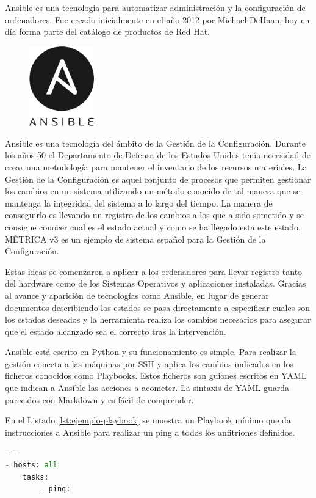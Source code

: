 Ansible es una tecnología para automatizar administración y la configuración de ordenadores. Fue creado inicialmente en el año 2012 por Michael DeHaan, hoy en día forma parte del catálogo de productos de Red Hat.

\begin{figure}
    \centering
    \includegraphics[width=0.25\textwidth]{imaxes/e-fundamentos-tecnologicos/logo-ansible.png}
\end{figure}

Ansible es una tecnología del ámbito de la Gestión de la Configuración. Durante los años 50 el Departamento de Defensa de los Estados Unidos tenía necesidad de crear una metodología para mantener el inventario de los recursos materiales. La Gestión de la Configuración es aquel conjunto de procesos que permiten gestionar los cambios en un sistema utilizando un método conocido de tal manera que se mantenga la integridad del sistema a lo largo del tiempo. La manera de conseguirlo es llevando un registro de los cambios a los que a sido sometido y se consigue conocer cual es el estado actual y como se ha llegado esta este estado. MÉTRICA v3 es un ejemplo de sistema español para la Gestión de la Configuración.

Estas ideas se comenzaron a aplicar a los ordenadores para llevar registro tanto del hardware como de los Sistemas Operativos y aplicaciones instaladas. Gracias al avance y aparición de tecnologías como Ansible, en lugar de generar documentos describiendo los estados se pasa directamente a especificar cuales son los estados deseados y la herramienta realiza los cambios necesarios para asegurar que el estado alcanzado sea el correcto tras la intervención.

Ansible está escrito en Python y su funcionamiento es simple. Para realizar la gestión conecta a las máquinas por SSH y aplica los cambios indicados en los ficheros conocidos como Playbooks. Estos ficheros son guiones escritos en YAML que indican a Ansible las acciones a acometer. La sintaxis de YAML guarda parecidos con Markdown y es fácil de comprender.

En el Listado \ref{lst:ejemplo-playbook} se muestra un Playbook mínimo que da instrucciones a Ansible para realizar un ping a todos los anfitriones definidos.

\begin{lstlisting}[language=Python,caption={Ejemplo mínimo de Playbook.},label=lst:ejemplo-playbook]
---
- hosts: all
    tasks:
        - ping:
\end{lstlisting}

